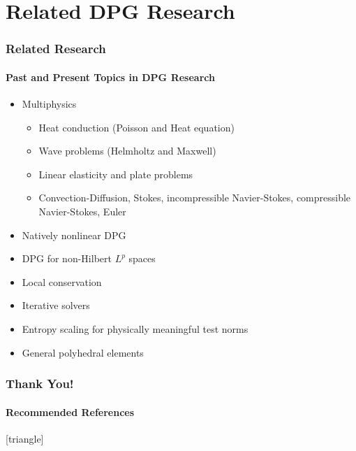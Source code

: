 \documentclass[18pt,xcolor=table]{beamer}
\begin{document}
\section{Related DPG Research}
\begin{frame}[t]
\frametitle{Related Research}
\framesubtitle{Past and Present Topics in DPG Research}  %
\begin{itemize}
\item Multiphysics
\begin{itemize}
  \item Heat conduction (Poisson and Heat equation)
  \item Wave problems (Helmholtz and Maxwell)
  \item Linear elasticity and plate problems
  \item Convection-Diffusion, Stokes, incompressible Navier-Stokes, compressible Navier-Stokes, Euler
\end{itemize}
\item Natively nonlinear DPG
\item DPG for non-Hilbert $L^p$ spaces
\item Local conservation
\item Iterative solvers
\item Entropy scaling for physically meaningful test norms
\item General polyhedral elements
\end{itemize}
\end{frame}

\begin{frame}[noframenumbering,shrink=10]
\frametitle{Thank You!}
\framesubtitle{Recommended References}
    \nocite{DPGOverview}
    \nocite{EllisLC}
    \nocite{CamelliaDPG}
    \nocite{DemkowiczHeuer}
    \nocite{ChanHeuerThanhDemkowicz2012}
    \nocite{DPGStokes}
    \renewcommand*{\bibfont}{\small}
    [triangle]
    \printbibliography[keyword=main]
    \printbibliography[notkeyword=main]
\end{frame}
\end{document}
